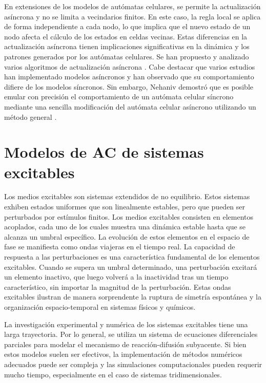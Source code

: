 En extensiones de los modelos de autómatas celulares, se permite la actualización asíncrona y no se limita a vecindarios finitos. En este caso, la regla local se aplica de forma independiente a cada nodo, lo que implica que el nuevo estado de un nodo afecta el cálculo de los estados en celdas vecinas. Estas diferencias en la actualización asíncrona tienen implicaciones significativas en la dinámica y los patrones generados por los autómatas celulares. Se han propuesto y analizado varios algoritmos de actualización asíncrona \cite{schonfisch_synchronous_1999,cornforth_ordered_2005,fates_guided_2013}. Cabe destacar que varios estudios han implementado modelos asíncronos y han observado que su comportamiento difiere de los modelos síncronos. Sin embargo, Nehaniv demostró que es posible emular con precisión el comportamiento de un autómata celular síncrono mediante una sencilla modificación del autómata celular asíncrono utilizando un método general \cite{nehaniv_asynchronous_2011}.



\section{Modelos de AC de sistemas excitables}\label{sec:medios_excitables}

Los medios excitables son sistemas extendidos de no equilibrio. Estos sistemas exhiben estados uniformes que son linealmente estables, pero que pueden ser perturbados por estímulos finitos. Los medios excitables consisten en elementos acoplados, cada uno de los cuales muestra una dinámica estable hasta que se alcanza un umbral específico. La evolución de estos elementos en el espacio de fase se manifiesta como ondas viajeras en el tiempo real. La capacidad de respuesta a las perturbaciones es una característica fundamental de los elementos excitables. Cuando se supera un umbral determinado, una perturbación excitará un elemento inactivo, que luego volverá a la inactividad tras un tiempo característico, sin importar la magnitud de la perturbación. Estas ondas excitables ilustran de manera sorprendente la ruptura de simetría espontánea y la organización espacio-temporal en sistemas físicos y químicos.

La investigación experimental y numérica de los sistemas excitables tiene una larga trayectoria. Por lo general, se utiliza un sistema de ecuaciones diferenciales parciales para modelar el mecanismo de reacción-difusión subyacente. Si bien estos modelos suelen ser efectivos, la implementación de métodos numéricos adecuados puede ser compleja y las simulaciones computacionales pueden requerir mucho tiempo, especialmente en el caso de sistemas tridimensionales.

